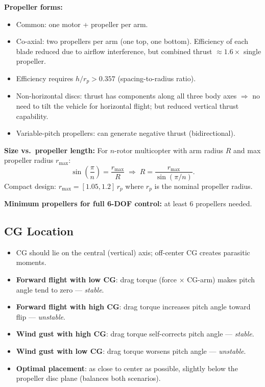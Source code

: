 \documentclass[11pt,a4paper]{article}
\begin{document}
\textbf{Propeller forms:}
\begin{itemize}
  \item Common: one motor + propeller per arm.
  \item Co-axial: two propellers per arm (one top, one bottom). Efficiency of each blade reduced due to airflow interference, but combined thrust $\approx 1.6\times$ single propeller.
  \item Efficiency requires $h/r_p > 0.357$ (spacing-to-radius ratio).
  \item Non-horizontal discs: thrust has components along all three body axes $\Rightarrow$ no need to tilt the vehicle for horizontal flight; but reduced vertical thrust capability.
  \item Variable-pitch propellers: can generate negative thrust (bidirectional).
\end{itemize}

\textbf{Size vs.\ propeller length:}
For $n$-rotor multicopter with arm radius $R$ and max propeller radius $r_{\max}$:
\[
\sin\!\left(\frac{\pi}{n}\right) = \frac{r_{\max}}{R}
\;\Rightarrow\;
R = \frac{r_{\max}}{\sin(\pi/n)}.
\]
Compact design: $r_{\max} = [1.05,1.2]\,r_p$ where $r_p$ is the nominal propeller radius.

\textbf{Minimum propellers for full 6-DOF control:} at least 6 propellers needed.

\subsection{CG Location}

\begin{itemize}
  \item CG should lie on the central (vertical) axis; off-center CG creates parasitic moments.
  \item \textbf{Forward flight with low CG}: drag torque (force × CG-arm) makes pitch angle tend to zero — \emph{stable}.
  \item \textbf{Forward flight with high CG}: drag torque increases pitch angle toward flip — \emph{unstable}.
  \item \textbf{Wind gust with high CG}: drag torque self-corrects pitch angle — \emph{stable}.
  \item \textbf{Wind gust with low CG}: drag torque worsens pitch angle — \emph{unstable}.
  \item \textbf{Optimal placement}: as close to center as possible, slightly below the propeller disc plane (balances both scenarios).
\end{itemize}
\end{document}
